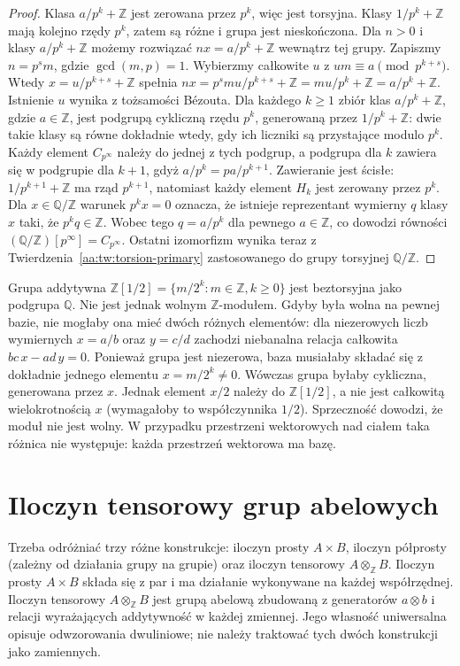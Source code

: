 \begin{proof}
Klasa $a/p^k+\mathbb Z$ jest zerowana przez $p^k$,
więc jest torsyjna. Klasy $1/p^k+\mathbb Z$ mają kolejno
rzędy $p^k$, zatem są różne i grupa jest nieskończona.
Dla $n>0$ i klasy $a/p^k+\mathbb Z$ możemy rozwiązać
$nx=a/p^k+\mathbb Z$ wewnątrz tej grupy.
Zapiszmy $n=p^s m$, gdzie $\gcd(m,p)=1$.
Wybierzmy całkowite $u$ z $um\equiv a\pmod{p^{k+s}}$.
Wtedy $x=u/p^{k+s}+\mathbb Z$ spełnia
$n x=p^s m u/p^{k+s}+\mathbb Z
= m u/p^k+\mathbb Z=a/p^k+\mathbb Z$.
Istnienie $u$ wynika z tożsamości Bézouta.
Dla każdego $k\ge1$ zbiór klas $a/p^k+\mathbb Z$, gdzie
$a\in\mathbb Z$, jest podgrupą cykliczną rzędu $p^k$,
generowaną przez $1/p^k+\mathbb Z$: dwie takie klasy
są równe dokładnie wtedy, gdy ich liczniki są przystające
modulo $p^k$. Każdy element $C_{p^\infty}$ należy do jednej
z tych podgrup, a podgrupa dla $k$ zawiera się w podgrupie
dla $k+1$, gdyż $a/p^k=pa/p^{k+1}$.
Zawieranie jest ścisłe: $1/p^{k+1}+\mathbb Z$ ma rząd $p^{k+1}$,
natomiast każdy element $H_k$ jest zerowany przez $p^k$.
Dla $x\in\mathbb Q/\mathbb Z$ warunek $p^k x=0$ oznacza,
że istnieje reprezentant wymierny $q$ klasy $x$ taki, że
$p^kq\in\mathbb Z$. Wobec tego $q=a/p^k$ dla pewnego
$a\in\mathbb Z$, co dowodzi równości
$(\mathbb Q/\mathbb Z)[p^\infty]=C_{p^\infty}$.
Ostatni izomorfizm wynika teraz z
Twierdzenia~\ref{aa:tw:torsion-primary} zastosowanego
do grupy torsyjnej $\mathbb Q/\mathbb Z$.
\end{proof}

\begin{przyklad}
\label{aa:prz:torsionfree-notfree}
Grupa addytywna $\mathbb Z[1/2]=\{m/2^k:m\in\mathbb Z,k\ge0\}$
jest beztorsyjna jako podgrupa $\mathbb Q$.
Nie jest jednak wolnym $\mathbb Z$-modułem.
Gdyby była wolna na pewnej bazie, nie mogłaby ona mieć
dwóch różnych elementów: dla niezerowych liczb wymiernych
$x=a/b$ oraz $y=c/d$ zachodzi niebanalna relacja całkowita
$bc\,x-ad\,y=0$. Ponieważ grupa jest niezerowa,
baza musiałaby składać się z dokładnie jednego elementu
$x=m/2^k\ne0$.
Wówczas grupa byłaby cykliczna, generowana przez $x$.
Jednak element $x/2$ należy do $\mathbb Z[1/2]$, a nie jest
całkowitą wielokrotnością $x$ (wymagałoby to współczynnika
$1/2$). Sprzeczność dowodzi, że moduł nie jest wolny.
W przypadku przestrzeni wektorowych nad ciałem taka różnica
nie występuje: każda przestrzeń wektorowa ma bazę.
\end{przyklad}

\section{Iloczyn tensorowy grup abelowych}
\label{aa:sec:abelian-tensor}
Trzeba odróżniać trzy różne konstrukcje: iloczyn prosty
$A\times B$, iloczyn półprosty (zależny od działania grupy
na grupie) oraz iloczyn tensorowy $A\otimes_{\mathbb Z}B$.
Iloczyn prosty $A\times B$ składa się z par i ma działanie
wykonywane na każdej współrzędnej. Iloczyn tensorowy
$A\otimes_{\mathbb Z}B$ jest grupą abelową zbudowaną
z generatorów $a\otimes b$ i relacji wyrażających addytywność
w każdej zmiennej. Jego własność uniwersalna opisuje
odwzorowania dwuliniowe; nie należy traktować tych dwóch
konstrukcji jako zamiennych.

